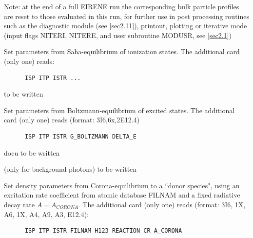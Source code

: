 \begin{description}
\begin{description}
                Note: at the end of a full EIRENE run the corresponding bulk particle profiles
                are reset to those evaluated in this run, for further use in post processing
                routines such as the diagnostic module (see \cref{sec2.11}), printout, plotting
                or iterative mode (input flags NITERI, NITERE, and user subroutine MODUSR, see
                \cref{sec2.1}) 

          \item[= 'Saha'] Set parameters from Saha-equilibrium of ionization states.
                The additional card (only one) reads:

                \begin{lstlisting}
      ISP ITP ISTR ...
\end{lstlisting}

                to be written
          \item[= 'Boltzmann']
                Set parameters
                from Boltzmann-equilibrium of excited states.
                The additional card (only one) reads (format: 3I6,6x,2E12.4)

                \begin{lstlisting}
      ISP ITP ISTR G_BOLTZMANN DELTA_E
\end{lstlisting} 

                docu to be written
          \item[= 'Planck'] (only for background photons) to be
                written
          \item[= 'Corona'] Set density parameters from Corona-equilibrium to a
                ``donor species", using an excitation rate coefficient from atomic database
                FILNAM and a fixed radiative decay rate $A=A_{CORONA}$.
                The additional card (only one) reads (format: 3I6, 1X, A6, 1X, A4, A9, A3,
                E12.4):

                \begin{lstlisting}
      ISP ITP ISTR FILNAM H123 REACTION CR A_CORONA
\end{lstlisting}


\end{description}
\end{description}
